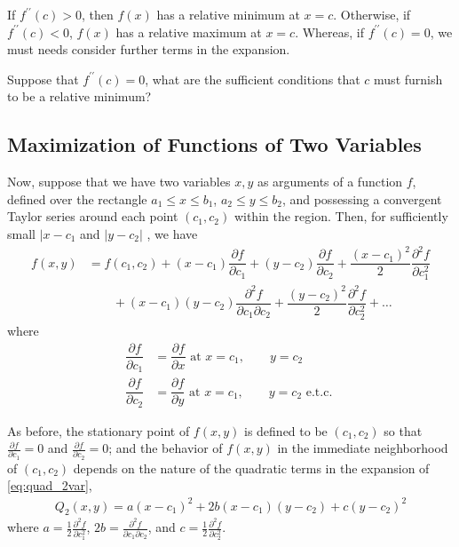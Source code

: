  If $f^{\prime\prime}(c) > 0$, then $f(x)$ has a relative minimum at $x=c$. Otherwise, if $f^{\prime\prime}(c) < 0$, $f(x)$ has a relative maximum at $x=c$. Whereas, if $f^{\prime\prime}(c) = 0$, we must needs consider further terms in the expansion.
 
 \begin{quiz}
 	Suppose that $f^{\prime\prime}(c) = 0$, what are the sufficient conditions that $c$ must furnish to be a relative minimum? %
 \end{quiz}
 
 \subsection{Maximization of Functions of Two Variables}
 Now, suppose that we have two variables $x, y$ as arguments of a function $f$, defined over the rectangle $a_1 \le x \le b_1$, $a_2 \le y \le b_2$, and possessing a convergent Taylor series around each point $(c_1, c_2)$ within the region. Then, for sufficiently small $|x-c_1$ and $|y-c_2|$ , we have
 \begin{align}
 	f(x,y) &= f(c_1, c_2) + (x-c_1) \dfrac{\partial f}{\partial c_1} + \left(y-c_2\right) \dfrac{\partial f}{\partial c_2} + \dfrac{(x-c_1)^2}{2} \dfrac{\partial^2 f}{\partial c_1^2}  \nonumber \\
 	& \qquad + (x-c_1)(y-c_2) \dfrac{\partial^2 f}{\partial c_1 \partial c_2} + \dfrac{(y-c_2)^2}{2} \dfrac{\partial^2 f}{\partial c_2^2} + \ldots 
 	\label{eq:quad_2var}
 \end{align}
 where
 \begin{align}
 	\dfrac{\partial f}{\partial c_1} &= \dfrac{\partial f}{\partial x} \text{ at } x = c_1, \qquad y = c_2 \nonumber \\
 	\dfrac{\partial f}{\partial c_2} &= \dfrac{\partial f}{\partial y} \text{ at } x = c_1, \qquad y = c_2 \text{ e.t.c. }
 \end{align}
 
 As before, the stationary point of $f(x, y)$ is defined to be $(c_1, c_2)$ so that $\frac{\partial f}{\partial c_1} = 0$ and $\frac{\partial f}{\partial c_2} = 0$; and the behavior of $f(x,y)$ in the immediate neighborhood of $(c_1, c_2)$ depends on the nature of the quadratic terms in the expansion of \eqref{eq:quad_2var}, 
 \begin{align}
 	Q_2(x,y) = a(x-c_1)^2 + 2b(x-c_1)(y-c_2) + c(y-c_2)^2
 \end{align}
 where
 $a = \frac{1}{2} \frac{\partial^2 f}{\partial c_1^2}$, $2b = \frac{\partial^2 f}{\partial c_1 \partial c_2}$, and $c=\frac{1}{2}\frac{\partial^2 f}{ \partial c_2^2}$.
 
